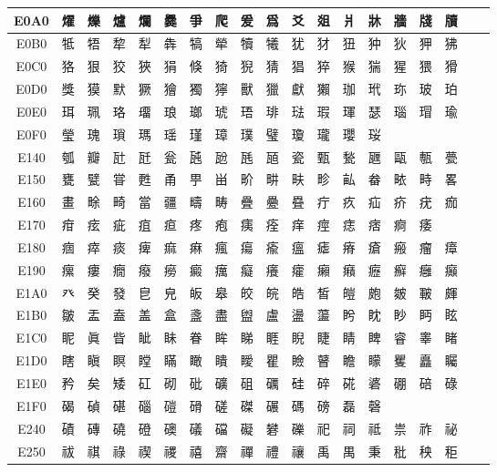 \begin{table}[H]
\begin{tabular}{|Sc|*{16}{>{\centering\arraybackslash}p{1em}|}>{\centering\arraybackslash}p{2.5em}|}
E0A0 & 燿 & 爍 & 爐 & 爛 & 爨 & 爭 & 爬 & 爰 & 爲 & 爻 & 爼 & 爿 & 牀 & 牆 & 牋 & 牘 \\ \hline
E0B0 & 牴 & 牾 & 犂 & 犁 & 犇 & 犒 & 犖 & 犢 & 犧 & 犹 & 犲 & 狃 & 狆 & 狄 & 狎 & 狒 \\ \hline
E0C0 & 狢 & 狠 & 狡 & 狹 & 狷 & 倏 & 猗 & 猊 & 猜 & 猖 & 猝 & 猴 & 猯 & 猩 & 猥 & 猾 \\ \hline
E0D0 & 獎 & 獏 & 默 & 獗 & 獪 & 獨 & 獰 & 獸 & 獵 & 獻 & 獺 & 珈 & 玳 & 珎 & 玻 & 珀 \\ \hline
E0E0 & 珥 & 珮 & 珞 & 璢 & 琅 & 瑯 & 琥 & 珸 & 琲 & 琺 & 瑕 & 琿 & 瑟 & 瑙 & 瑁 & 瑜 \\ \hline
E0F0 & 瑩 & 瑰 & 瑣 & 瑪 & 瑶 & 瑾 & 璋 & 璞 & 璧 & 瓊 & 瓏 & 瓔 & 珱 & & & \\ \hline
E140 & 瓠 & 瓣 & 瓧 & 瓩 & 瓮 & 瓲 & 瓰 & 瓱 & 瓸 & 瓷 & 甄 & 甃 & 甅 & 甌 & 甎 & 甍 \\ \hline
E150 & 甕 & 甓 & 甞 & 甦 & 甬 & 甼 & 畄 & 畍 & 畊 & 畉 & 畛 & 畆 & 畚 & 畩 & 畤 & 畧 \\ \hline
E160 & 畫 & 畭 & 畸 & 當 & 疆 & 疇 & 畴 & 疊 & 疉 & 疂 & 疔 & 疚 & 疝 & 疥 & 疣 & 痂 \\ \hline
E170 & 疳 & 痃 & 疵 & 疽 & 疸 & 疼 & 疱 & 痍 & 痊 & 痒 & 痙 & 痣 & 痞 & 痾 & 痿 & \\ \hline
E180 & 痼 & 瘁 & 痰 & 痺 & 痲 & 痳 & 瘋 & 瘍 & 瘉 & 瘟 & 瘧 & 瘠 & 瘡 & 瘢 & 瘤 & 瘴 \\ \hline
E190 & 瘰 & 瘻 & 癇 & 癈 & 癆 & 癜 & 癘 & 癡 & 癢 & 癨 & 癩 & 癪 & 癧 & 癬 & 癰 & 癲 \\ \hline
E1A0 & 癶 & 癸 & 發 & 皀 & 皃 & 皈 & 皋 & 皎 & 皖 & 皓 & 皙 & 皚 & 皰 & 皴 & 皸 & 皹 \\ \hline
E1B0 & 皺 & 盂 & 盍 & 盖 & 盒 & 盞 & 盡 & 盥 & 盧 & 盪 & 蘯 & 盻 & 眈 & 眇 & 眄 & 眩 \\ \hline
E1C0 & 眤 & 眞 & 眥 & 眦 & 眛 & 眷 & 眸 & 睇 & 睚 & 睨 & 睫 & 睛 & 睥 & 睿 & 睾 & 睹 \\ \hline
E1D0 & 瞎 & 瞋 & 瞑 & 瞠 & 瞞 & 瞰 & 瞶 & 瞹 & 瞿 & 瞼 & 瞽 & 瞻 & 矇 & 矍 & 矗 & 矚 \\ \hline
E1E0 & 矜 & 矣 & 矮 & 矼 & 砌 & 砒 & 礦 & 砠 & 礪 & 硅 & 碎 & 硴 & 碆 & 硼 & 碚 & 碌 \\ \hline
E1F0 & 碣 & 碵 & 碪 & 碯 & 磑 & 磆 & 磋 & 磔 & 碾 & 碼 & 磅 & 磊 & 磬 & & & \\ \hline
E240 & 磧 & 磚 & 磽 & 磴 & 礇 & 礒 & 礑 & 礙 & 礬 & 礫 & 祀 & 祠 & 祗 & 祟 & 祚 & 祕 \\ \hline
E250 & 祓 & 祺 & 祿 & 禊 & 禝 & 禧 & 齋 & 禪 & 禮 & 禳 & 禹 & 禺 & 秉 & 秕 & 秧 & 秬 \\ \hline

\end{tabular}
\end{table}

